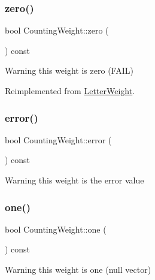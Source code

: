 \subsubsection{\texorpdfstring{zero()}{zero()}}
{\footnotesize\ttfamily bool Counting\+Weight\+::zero (\begin{DoxyParamCaption}{ }\end{DoxyParamCaption}) const\hspace{0.3cm}{\ttfamily [virtual]}}

\begin{DoxyWarning}{Warning}
this weight is zero (F\+A\+IL) 
\end{DoxyWarning}


Reimplemented from \mbox{\hyperlink{group__weight_gabaad113da06b47c4b291558d05da6aa6}{Letter\+Weight}}.

\mbox{\label{group__weight_ga41f35b8902b2474f1ac39878a40f5ca5}} 
\subsubsection{\texorpdfstring{error()}{error()}}
{\footnotesize\ttfamily bool Counting\+Weight\+::error (\begin{DoxyParamCaption}{ }\end{DoxyParamCaption}) const}

\begin{DoxyWarning}{Warning}
this weight is the error value 
\end{DoxyWarning}
\mbox{\label{group__weight_ga5189380be1ac03126180846e3a8fd1cb}} 
\subsubsection{\texorpdfstring{one()}{one()}}
{\footnotesize\ttfamily bool Counting\+Weight\+::one (\begin{DoxyParamCaption}{ }\end{DoxyParamCaption}) const\hspace{0.3cm}{\ttfamily [virtual]}}

\begin{DoxyWarning}{Warning}
this weight is one (null vector) 
\end{DoxyWarning}


